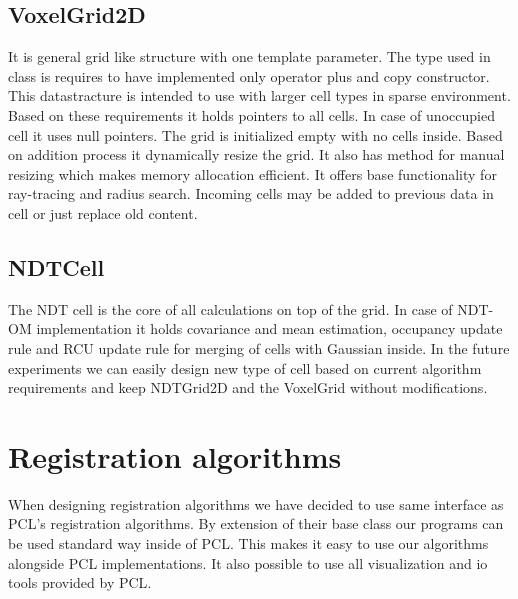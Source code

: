 \subsection{VoxelGrid2D}
It is general grid like structure with one template parameter. The type used in class is requires to have implemented only  operator plus and copy constructor. This datastracture is intended to use with larger cell types in sparse environment. Based on these requirements it holds pointers to all cells. In case of unoccupied cell it uses null pointers. The grid is initialized empty with no cells inside. Based on addition process it dynamically resize the grid. It also has method for manual resizing which makes memory allocation efficient. It offers base functionality for ray-tracing and radius search. Incoming cells may be added to previous data in cell or just replace old content.  
\subsection{NDTCell}
The \gls{NDT} cell is the core of all calculations on top of the grid. In case of \gls{NDT-OM} implementation it holds covariance and mean estimation, occupancy update rule and \gls{RCU} update rule for merging of cells with Gaussian inside. In the future experiments we can easily design new type of cell based on current algorithm requirements and keep NDTGrid2D and the VoxelGrid without modifications.
\section{Registration algorithms}
When designing registration algorithms we have decided to use same interface as \gls{PCL}'s registration algorithms. By extension of their base class our programs can be used standard way inside of \gls{PCL}. This makes it easy to use our algorithms alongside \gls{PCL}  implementations. It also possible to use all visualization and io tools provided by \gls{PCL}. 

